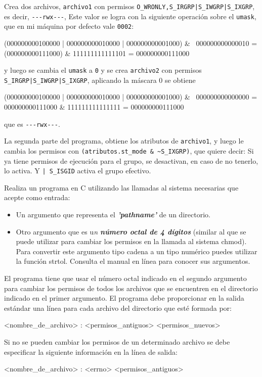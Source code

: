 {\color{blue} Crea dos archivos, \verb!archivo1! con permisos \verb!O_WRONLY,S_IRGRP|S_IWGRP|S_IXGRP!, es decir, \verb!---rwx---!, Este valor se logra con la siguiente operación sobre el \verb!umask!, que en mi máquina por defecto vale \verb!0002!:
\begin{cppcode}
(000000000100000 | 000000000010000 | 000000000001000) 
&           ~000000000000010 
= (000000000111000) & 111111111111101 
= 000000000111000
\end{cppcode}
 y luego se cambia el \verb!umask! a \verb!0! y se crea \verb!archivo2! con permisos \verb!S_IRGRP|S_IWGRP|S_IXGRP!, aplicando la máscara 0 se obtiene 
\begin{cppcode}
(000000000100000 | 000000000010000 | 000000000001000) 
&           ~000000000000000  
= 000000000111000 & 111111111111111 
= 000000000111000
\end{cppcode}
que es \verb!---rwx---!.

La segunda parte del programa, obtiene los atributos de \verb!archivo1!, y luego le cambia los permisos con \verb!(atributos.st_mode & ~S_IXGRP)!, que quiere decir: Si ya tiene permisos de ejecución para el grupo, se desactivan, en caso de no tenerlo, lo activa. Y \verb!| S_ISGID! activa el grupo efectivo.
}


\begin{exercise}
Realiza un programa en C utilizando las llamadas al sistema necesarias que
acepte como entrada:
\begin{itemize}
	\item Un argumento que representa el \emph{\textbf{'pathname'}} de un directorio.
    \item Otro argumento que es u\emph{n \textbf{número octal de 4 dígitos}} (similar al que se puede utilizar
para cambiar los permisos en la llamada al sistema chmod). Para convertir este
argumento tipo cadena a un tipo numérico puedes utilizar la función strtol. Consulta
el manual en línea para conocer sus argumentos.
\end{itemize}
El programa tiene que usar el número octal indicado en el segundo argumento para cambiar
los permisos de todos los archivos que se encuentren en el directorio indicado en el primer
argumento.
El programa debe proporcionar en la salida estándar una línea para cada archivo del
directorio que esté formada por:
\begin{bashcode}
<nombre_de_archivo> : <permisos_antiguos> <permisos_nuevos>
\end{bashcode}
Si no se pueden cambiar los permisos de un determinado archivo se debe especificar la
siguiente información en la línea de salida:
\begin{bashcode}
<nombre_de_archivo> : <errno> <permisos_antiguos>
\end{bashcode}


\end{exercise}


